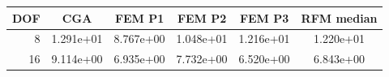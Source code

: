 \begin{tabular}{rccccc}
\toprule
DOF & CGA & FEM P1 & FEM P2 & FEM P3 & RFM median \\
\midrule
8 & 1.291e+01 & 8.767e+00 & 1.048e+01 & 1.216e+01 & 1.220e+01 \\
16 & 9.114e+00 & 6.935e+00 & 7.732e+00 & 6.520e+00 & 6.843e+00 \\
\bottomrule
\end{tabular}
